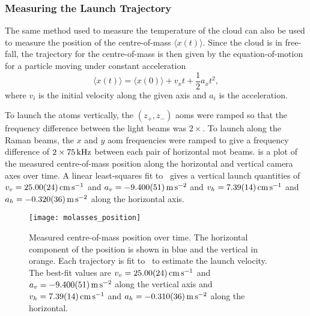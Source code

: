 \subsubsection{Measuring the Launch Trajectory}
The same method used to measure the temperature of the cloud can also
be used to measure the position of the centre-of-mass \(\langle
x(t)\rangle\). Since the cloud
is in free-fall, the trajectory for the centre-of-mass is then given
by the equation-of-motion for a particle moving under
constant acceleration
\begin{equation}
  \langle x(t) \rangle = \langle x(0) \rangle + v_x t + \frac{1}{2}
  a_x t^2,
  \label{eq:position_free}
\end{equation}
where \(v_i\) is the initial velocity along the given axis and \(a_i\)
is the acceleration.
\par\noindent
To launch the atoms vertically, the \((z_+, z_-)\) \acp{aom} were
ramped so that the frequency difference between the light beams was
\(2\times\). To launch along the Raman
beams, the \(x\) and \(y\) \ac{aom}
frequencies were ramped to give a frequency difference of \(2\times
\sivalue{75}{\kilo\hertz}\) between each pair of horizontal \ac{mot} beams.
 is a plot of the measured
centre-of-mass position along the horizontal and vertical camera axes
over time. A linear least-squares fit
to~ gives a vertical launch quantities
of \(v_v = \sivalue{25.0\pm0.24}{\centi\meter\per\second}\) and \(a_v
= \sivalue{-9.40\pm0.051}{\metre\per\second\squared}\) and \(v_h =
\sivalue{7.39\pm0.14}{\centi\meter\per\second}\) and \(a_h =
\sivalue{-0.32\pm0.036}{\metre\per\second\squared}\) along the
horizontal axis. 
\begin{figure}[!htbp]
  \centering
  \texttt{[image: molasses\_position]}
  \caption[Atom cloud centre-of-mass over time]{Measured
    centre-of-mass position over time. The horizontal component of the
    position is shown in blue and the vertical in orange. Each
    trajectory is fit to~ to estimate the
    launch velocity. The best-fit values are \(v_v =
    \sivalue{25.0\pm0.24}{\centi\meter\per\second}\) and \(a_v =
    \sivalue{-9.40\pm0.051}{\metre\per\second\squared}\) along the
    vertical axis and \(v_h =
    \sivalue{7.39\pm0.14}{\centi\meter\per\second}\) and \(a_h =
    \sivalue{-0.31\pm0.036}{\metre\per\second\squared}\) along the
  horizontal.}
  \label{fig:molasses_position}
\end{figure}
